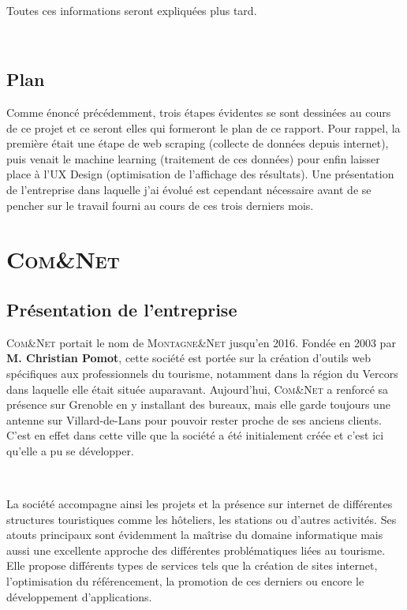 \documentclass[12pt]{article}
\begin{document}
\

Toutes ces informations seront expliquées plus tard.

\

\subsection{Plan}

Comme énoncé précédemment, trois étapes évidentes se sont dessinées au cours de ce projet et ce seront elles qui formeront le plan de ce rapport. Pour rappel, la première était une étape de web scraping (collecte de données depuis internet), puis venait le machine learning (traitement de ces données) pour enfin laisser place à l'UX Design (optimisation de l'affichage des résultats). Une présentation de l'entreprise dans laquelle j'ai évolué est cependant nécessaire avant de se pencher sur le travail fourni au cours de ces trois derniers mois.



\newpage
\section{\textsc{Com\&Net}}

\subsection{Présentation de l'entreprise}

\textsc{Com\&Net} portait le nom de \textsc{Montagne\&Net} jusqu'en 2016. Fondée en 2003 par \textbf{M. Christian Pomot}, cette société est portée sur la création d'outils web spécifiques aux professionnels du tourisme, notamment dans la région du Vercors dans laquelle elle était située auparavant. Aujourd'hui, \textsc{Com\&Net} a renforcé sa présence sur Grenoble en y installant des bureaux, mais elle garde toujours une antenne sur Villard-de-Lans pour pouvoir rester proche de ses anciens clients. C'est en effet dans cette ville que la société a été initialement créée et c'est ici qu'elle a pu se développer.

\

La société accompagne ainsi les projets et la présence sur internet de différentes structures touristiques comme les hôteliers, les stations ou d'autres activités. Ses atouts principaux sont évidemment la maîtrise du domaine informatique mais aussi une excellente approche des différentes problématiques liées au tourisme. Elle propose différents types de services tels que la création de sites internet, l'optimisation du référencement, la promotion de ces derniers ou encore le développement d'applications.
\end{document}
